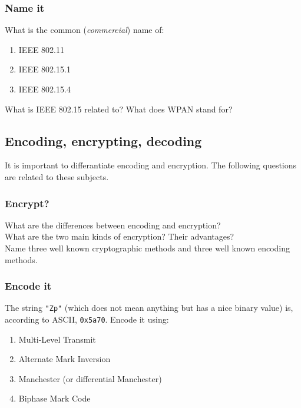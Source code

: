 \documentclass[11pt]{article}
\begin{document}
\subsubsection{Name it}
What is the common (\emph{commercial}) name of:
  \begin{enumerate}
    \item IEEE 802.11   %
    \item IEEE 802.15.1 %
    \item IEEE 802.15.4 %
  \end{enumerate}
What is IEEE 802.15 related to? What does WPAN stand for? %

\subsection{Encoding, encrypting, decoding}
It is important to differantiate encoding and encryption. The following questions are related to these subjects.
\subsubsection{Encrypt?}
What are the differences between encoding and encryption?\\     %
What are the two main kinds of encryption? Their advantages?\\  %
Name three well known cryptographic methods and three well known encoding methods. %

\subsubsection{Encode it}
The string \verb$"Zp"$ (which does not mean anything but has a nice binary value) is, according to ASCII, \verb$0x5a70$. Encode it using:
  \begin{enumerate}
    \item Multi-Level Transmit
    \item Alternate Mark Inversion
    \item Manchester (or differential Manchester)
    \item Biphase Mark Code
  \end{enumerate}
\end{document}
